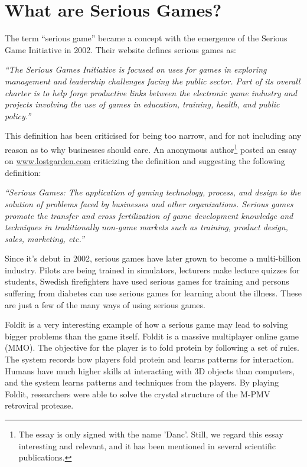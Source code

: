 \section{What are Serious Games?}
\label{sec:seriousgames}

The term ``serious game'' became a concept with the emergence of the Serious Game Initiative in 2002\cite{seriousgamesinitative}. Their website defines serious games as: 

\textit{``The Serious Games Initiative is focused on uses for games in exploring management and leadership challenges facing the public sector. Part of its overall charter is to help forge productive links between the electronic game industry and projects involving the use of games in education, training, health, and public policy.''} 

This definition has been criticised for being too narrow, and for not including any reason as to why businesses should care. An anonymous author\footnote{The essay is only signed with the name 'Danc'. Still, we regard this essay interesting and relevant, and it has been mentioned in several scientific publications.} posted an essay on \url{www.lostgarden.com} criticizing the definition and suggesting the following definition:

\textit{``Serious Games: The application of gaming technology, process, and design to the solution of problems faced by businesses and other organizations. Serious games promote the transfer and cross fertilization of game development knowledge and techniques in traditionally non-game markets such as training, product design, sales, marketing, etc.''}


Since it's debut in 2002, serious games have later grown to become a multi-billion industry.
Pilots are being trained in simulators, lecturers make lecture quizzes for students\cite{wang2007lecture}, Swedish firefighters have used serious games for training\cite{lebram2009design} and persons suffering from diabetes can use serious games for learning about the illness. These are just a few of the many ways of using serious games. 

Foldit is a very interesting example of how a serious game may lead to solving bigger problems than the game itself\cite{cooper2010predicting}. Foldit is a massive multiplayer online game (MMO). The objective for the player is to fold protein by following a set of rules. The system records how players fold protein and learns patterns for interaction. Humans have much higher skills at interacting with 3D objects than computers, and the system learns patterns and techniques from the players. By playing Foldit, researchers were able to solve the crystal structure of the M-PMV retroviral protease\cite{khatib2011crystal}.

